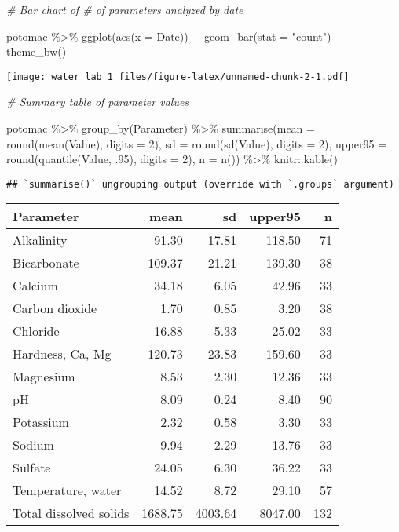 \documentclass[
]{article}
\newenvironment{Shaded}{\begin{snugshade}}{\end{snugshade}}
\newcommand{\AttributeTok}[1]{\textcolor[rgb]{0.77,0.63,0.00}{#1}}
\newcommand{\CommentTok}[1]{\textcolor[rgb]{0.56,0.35,0.01}{\textit{#1}}}
\newcommand{\DecValTok}[1]{\textcolor[rgb]{0.00,0.00,0.81}{#1}}
\newcommand{\FunctionTok}[1]{\textcolor[rgb]{0.00,0.00,0.00}{#1}}
\newcommand{\NormalTok}[1]{#1}
\newcommand{\SpecialCharTok}[1]{\textcolor[rgb]{0.00,0.00,0.00}{#1}}
\newcommand{\StringTok}[1]{\textcolor[rgb]{0.31,0.60,0.02}{#1}}
\begin{document}
\begin{Shaded}
\begin{Highlighting}[]
\CommentTok{\# Bar chart of \# of parameters analyzed by date}

\NormalTok{potomac }\SpecialCharTok{\%\textgreater{}\%} 
  \FunctionTok{ggplot}\NormalTok{(}\FunctionTok{aes}\NormalTok{(}\AttributeTok{x =}\NormalTok{ Date)) }\SpecialCharTok{+}
    \FunctionTok{geom\_bar}\NormalTok{(}\AttributeTok{stat =} \StringTok{"count"}\NormalTok{) }\SpecialCharTok{+}
  \FunctionTok{theme\_bw}\NormalTok{()}
\end{Highlighting}
\end{Shaded}

\texttt{[image: water\_lab\_1\_files/figure-latex/unnamed-chunk-2-1.pdf]}

\begin{Shaded}
\begin{Highlighting}[]
\CommentTok{\# Summary table of parameter values}

\NormalTok{potomac }\SpecialCharTok{\%\textgreater{}\%} 
  \FunctionTok{group\_by}\NormalTok{(Parameter) }\SpecialCharTok{\%\textgreater{}\%} 
    \FunctionTok{summarise}\NormalTok{(}\AttributeTok{mean =} \FunctionTok{round}\NormalTok{(}\FunctionTok{mean}\NormalTok{(Value), }\AttributeTok{digits =} \DecValTok{2}\NormalTok{),}
              \AttributeTok{sd =} \FunctionTok{round}\NormalTok{(}\FunctionTok{sd}\NormalTok{(Value), }\AttributeTok{digits =} \DecValTok{2}\NormalTok{),}
              \AttributeTok{upper95 =} \FunctionTok{round}\NormalTok{(}\FunctionTok{quantile}\NormalTok{(Value, .}\DecValTok{95}\NormalTok{), }\AttributeTok{digits =} \DecValTok{2}\NormalTok{),}
              \AttributeTok{n =} \FunctionTok{n}\NormalTok{()) }\SpecialCharTok{\%\textgreater{}\%} 
\NormalTok{  knitr}\SpecialCharTok{::}\FunctionTok{kable}\NormalTok{()}
\end{Highlighting}
\end{Shaded}

\begin{verbatim}
## `summarise()` ungrouping output (override with `.groups` argument)
\end{verbatim}

\begin{longtable}[]{@{}lrrrr@{}}
\toprule
Parameter & mean & sd & upper95 & n\tabularnewline
\midrule
\endhead
Alkalinity & 91.30 & 17.81 & 118.50 & 71\tabularnewline
Bicarbonate & 109.37 & 21.21 & 139.30 & 38\tabularnewline
Calcium & 34.18 & 6.05 & 42.96 & 33\tabularnewline
Carbon dioxide & 1.70 & 0.85 & 3.20 & 38\tabularnewline
Chloride & 16.88 & 5.33 & 25.02 & 33\tabularnewline
Hardness, Ca, Mg & 120.73 & 23.83 & 159.60 & 33\tabularnewline
Magnesium & 8.53 & 2.30 & 12.36 & 33\tabularnewline
pH & 8.09 & 0.24 & 8.40 & 90\tabularnewline
Potassium & 2.32 & 0.58 & 3.30 & 33\tabularnewline
Sodium & 9.94 & 2.29 & 13.76 & 33\tabularnewline
Sulfate & 24.05 & 6.30 & 36.22 & 33\tabularnewline
Temperature, water & 14.52 & 8.72 & 29.10 & 57\tabularnewline
Total dissolved solids & 1688.75 & 4003.64 & 8047.00 &
132\tabularnewline
\bottomrule
\end{longtable}
\end{document}
